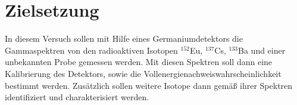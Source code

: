 \section{Zielsetzung}
In diesem Versuch sollen mit Hilfe eines Germaniumdetektors die Gammaspektren von den radioaktiven Isotopen $^{152}$Eu, $^{137}$Cs, $^{133}$Ba und einer unbekannten Probe gemessen werden.
Mit diesen Spektren soll dann eine Kalibrierung des Detektors, sowie die Vollenergienachweiswahrscheinlichkeit bestimmt werden.
Zusätzlich sollen weitere Isotope dann gemäß ihrer Spektren identifiziert und charakterisiert werden.